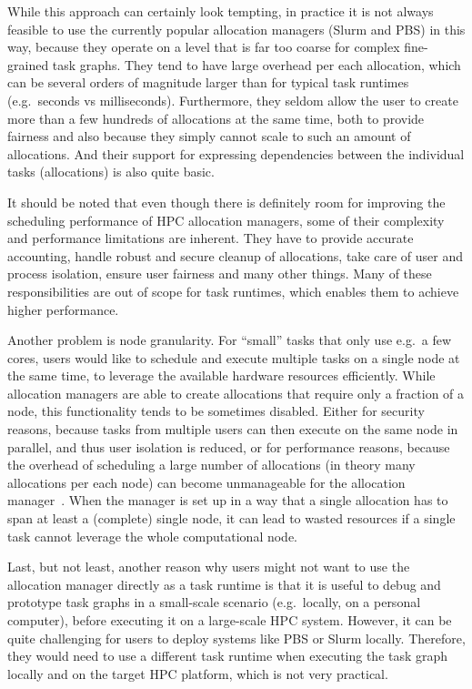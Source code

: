 While this approach can certainly look tempting, in practice it is not always feasible to use the
currently popular allocation managers (Slurm and PBS) in this way, because they operate on a level
that is far too coarse for complex fine-grained task graphs. They tend to have large overhead per
each allocation, which can be several orders of magnitude larger than for typical task runtimes
(e.g.\ seconds vs milliseconds). Furthermore, they seldom allow the user to create more than a few
hundreds of allocations at the same time, both to provide fairness and also because they simply
cannot scale to such an amount of allocations. And their support for expressing dependencies
between the individual tasks (allocations) is also quite basic.

It should be noted that even though there is definitely room for improving the scheduling
performance of HPC allocation managers, some of their complexity and performance limitations are
inherent. They have to provide accurate accounting, handle robust and secure cleanup of
allocations, take care of user and process isolation, ensure user fairness and many other things.
Many of these responsibilities are out of scope for task runtimes, which enables them to achieve
higher performance.

Another problem is node granularity. For ``small'' tasks that only use e.g.\ a few cores, users
would like to schedule and execute multiple tasks on a single node at the same time, to leverage
the available hardware resources efficiently. While allocation managers are able to create
allocations that require only a fraction of a node, this functionality tends to be sometimes
disabled. Either for security reasons, because tasks from multiple users can then execute on the
same node in parallel, and thus user isolation is reduced, or for performance reasons, because the
overhead of scheduling a large number of allocations (in theory many allocations per each node) can
become unmanageable for the allocation manager~\cite{it4i_node_scheduling_policy}. When the manager is set
up in a way that a single allocation has to span at least a (complete) single node, it can lead to
wasted resources if a single task cannot leverage the whole computational node.

Last, but not least, another reason why users might not want to use the allocation manager directly
as a task runtime is that it is useful to debug and prototype task graphs in a small-scale scenario
(e.g.\ locally, on a personal computer), before executing it on a large-scale HPC system. However,
it can be quite challenging for users to deploy systems like PBS or Slurm locally. Therefore, they
would need to use a different task runtime when executing the task graph locally and on the target
HPC platform, which is not very practical.

